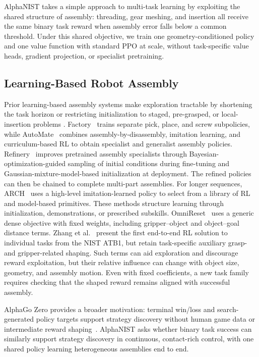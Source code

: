 AlphaNIST takes a simple approach to multi-task learning by exploiting
the shared structure of assembly: threading, gear meshing, and insertion
all receive the same binary task reward when assembly error falls below
a common threshold. Under this shared objective, we train one
geometry-conditioned policy and one value function with standard PPO
at scale, without task-specific value heads, gradient projection,
or specialist pretraining.

\subsection{Learning-Based Robot Assembly}
Prior learning-based assembly systems make exploration tractable by shortening
the task horizon or restricting initialization to staged, pre-grasped, or
local-insertion problems
\cite{schoettler2020industrial,florensa2017reverse}.
Factory~\cite{narang2022factory} trains separate pick, place, and screw
subpolicies, while AutoMate~\cite{tang2024automate} combines
assembly-by-disassembly, imitation learning, and curriculum-based RL to obtain
specialist and generalist assembly policies.
Refinery~\cite{tang2025refinery} improves pretrained assembly specialists
through Bayesian-optimization-guided sampling of initial conditions during
fine-tuning and Gaussian-mixture-model-based initialization at deployment.
The refined policies can then be chained to complete multi-part assemblies.
For longer sequences,
ARCH~\cite{sun2025arch} uses a high-level imitation-learned policy to select from
a library of RL and model-based primitives. These methods structure learning
through initialization, demonstrations, or prescribed subskills.
OmniReset~\cite{yin2026omnireset} uses a generic dense objective with fixed
weights, including gripper--object and object--goal distance terms. Zhang et al.~\cite{zhang2026balanceddiet} present the first end-to-end RL solution to individual tasks from the NIST ATB1, but retain task-specific
auxiliary grasp- and gripper-related shaping. Such
terms can aid exploration and discourage reward exploitation, but their relative
influence can change with object size, geometry, and assembly motion. Even with
fixed coefficients, a new task family requires checking that the shaped reward
remains aligned with successful assembly.

AlphaGo Zero provides a broader motivation: terminal win/loss and
search-generated policy targets support strategy discovery without human game
data or intermediate reward shaping~\cite{silver2017alphagozero}. AlphaNIST asks
whether binary task success can similarly support strategy discovery in continuous,
contact-rich control, with one shared policy learning heterogeneous
assemblies end to end.

